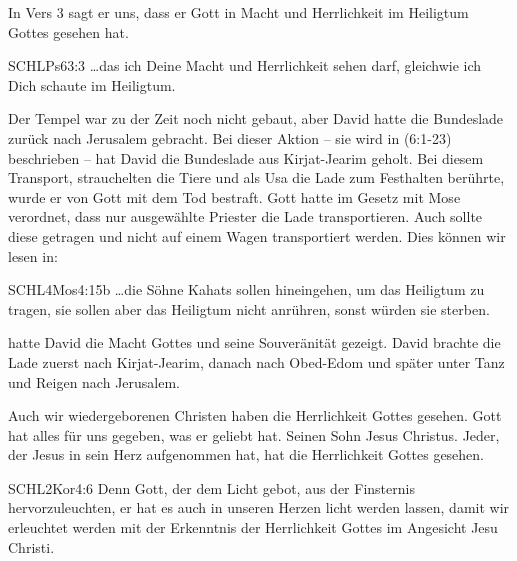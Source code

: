 \documentclass[14pt]{mybib}
\begin{document}
    \begin{otsblock}
        In Vers 3 sagt er uns, dass er Gott in Macht und Herrlichkeit im Heiligtum Gottes gesehen hat.
        \begin{bibelbox}{SCHL}{Ps}{63:3}
            \dots das ich Deine Macht und Herrlichkeit sehen darf, gleichwie ich Dich schaute im Heiligtum.
        \end{bibelbox}
        Der Tempel war zu der Zeit noch nicht gebaut, aber David hatte die Bundeslade zurück nach Jerusalem gebracht. Bei dieser Aktion -- sie wird in  (6:1-23) beschrieben -- hat David die Bundeslade aus Kirjat-Jearim geholt. Bei diesem Transport, strauchelten die Tiere und als Usa die Lade zum Festhalten berührte, wurde er von Gott mit dem Tod bestraft. Gott hatte im Gesetz mit Mose verordnet, dass nur ausgewählte Priester die Lade transportieren. Auch sollte diese getragen und nicht auf einem Wagen transportiert werden. Dies können wir lesen in:
        \begin{bibelbox}{SCHL}{4Mos}{4:15b}
            \dots die Söhne Kahats sollen hineingehen, um das Heiligtum zu tragen, sie sollen aber das Heiligtum nicht anrühren, sonst würden sie sterben.
        \end{bibelbox}
         hatte David die Macht Gottes und seine Souveränität gezeigt. David brachte die Lade zuerst nach Kirjat-Jearim, danach nach Obed-Edom und später unter Tanz und Reigen nach Jerusalem.
    \end{otsblock}

    \begin{otsblock}
        Auch wir wiedergeborenen Christen haben die Herrlichkeit Gottes gesehen. Gott hat alles für uns gegeben, was er geliebt hat. Seinen Sohn Jesus Christus. Jeder, der Jesus in sein Herz aufgenommen hat, hat die Herrlichkeit Gottes gesehen.
        \begin{bibelbox}{SCHL}{2Kor}{4:6}
            Denn Gott, der dem Licht gebot, aus der Finsternis hervorzuleuchten, er hat es auch in unseren Herzen licht werden lassen, damit wir erleuchtet werden mit der Erkenntnis der Herrlichkeit Gottes im Angesicht Jesu Christi.
        \end{bibelbox}
    \end{otsblock}
\end{document}
